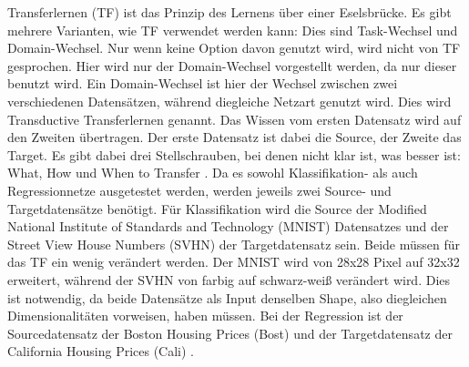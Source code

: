 Transferlernen (TF) ist das Prinzip des Lernens über einer Eselsbrücke. 
Es gibt mehrere Varianten, wie TF verwendet werden kann: Dies sind Task-Wechsel und Domain-Wechsel. 
Nur wenn keine Option davon genutzt wird, wird nicht von TF gesprochen. 
Hier wird nur der Domain-Wechsel vorgestellt werden, da nur dieser benutzt wird. Ein Domain-Wechsel ist hier der Wechsel 
zwischen zwei verschiedenen Datensätzen, während diegleiche Netzart genutzt wird. 
Dies wird Transductive Transferlernen \cite{survey_transfer} genannt. 
Das Wissen vom ersten Datensatz wird auf den Zweiten übertragen. Der erste Datensatz ist dabei die Source, der Zweite das Target. 
Es gibt dabei drei Stellschrauben, bei denen nicht klar ist, was besser ist: What, How und When to Transfer \cite{survey_transfer}. 
Da es sowohl Klassifikation- als auch Regressionnetze ausgetestet werden, werden jeweils zwei Source- und Targetdatensätze benötigt. 
Für Klassifikation wird die Source der Modified National Institute of Standards and Technology \cite{handwritten_digit} (MNIST) Datensatzes  
und der 
Street View House Numbers (SVHN) \cite{house_numbers} der Targetdatensatz sein. Beide müssen für das TF ein wenig 
verändert werden. Der MNIST wird von 28x28 Pixel auf 32x32 erweitert, während der SVHN von farbig auf schwarz-weiß verändert wird. 
Dies ist notwendig, da beide Datensätze als Input denselben Shape, also diegleichen Dimensionalitäten vorweisen, haben müssen. 
Bei der Regression ist der Sourcedatensatz der Boston Housing Prices (Bost) \cite{Boston_housing} und der Targetdatensatz der 
California Housing Prices (Cali) \cite{California_housing}. 

